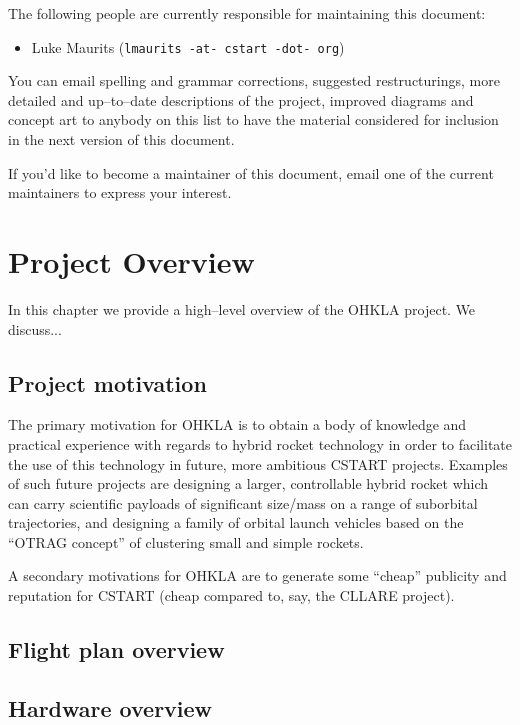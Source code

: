 \documentclass{report}
\begin{document}
The following people are currently responsible for maintaining this document:
\begin{itemize}
\item Luke Maurits (\texttt{lmaurits -at- cstart -dot- org})
\end{itemize}
You can email spelling and grammar corrections, suggested restructurings, more detailed and up--to--date descriptions of the project, improved diagrams and concept art to anybody on this list to have the material considered for inclusion in the next version of this document.

If you'd like to become a maintainer of this document, email one of the current maintainers to express your interest.


\chapter{Project Overview}

In this chapter we provide a high--level overview of the OHKLA project.  We discuss...

\section{Project motivation}

The primary motivation for OHKLA is to obtain a body of knowledge and practical experience with regards to hybrid rocket technology in order to facilitate the use of this technology in future, more ambitious CSTART projects.  Examples of such future projects are designing a larger, controllable hybrid rocket which can carry scientific payloads of significant size/mass on a range of suborbital trajectories, and designing a family of orbital launch vehicles based on the ``OTRAG concept'' of clustering small and simple rockets.

A secondary motivations for OHKLA are to generate some ``cheap'' publicity and reputation for CSTART (cheap compared to, say, the CLLARE project). 

\section{Flight plan overview}

\section{Hardware overview}
\end{document}
